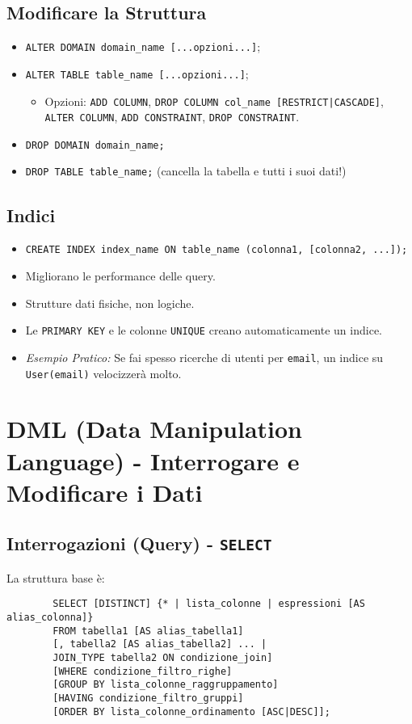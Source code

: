 \documentclass{article}
\begin{document}
	\subsection{Modificare la Struttura}
	\begin{itemize}
		\item \texttt{ALTER DOMAIN domain\_name [...opzioni...]};
		\item \texttt{ALTER TABLE table\_name [...opzioni...]};
		\begin{itemize}
			\item Opzioni: \texttt{ADD COLUMN}, \texttt{DROP COLUMN col\_name [RESTRICT|CASCADE]}, \texttt{ALTER COLUMN}, \texttt{ADD CONSTRAINT}, \texttt{DROP CONSTRAINT}.
		\end{itemize}
		\item \texttt{DROP DOMAIN domain\_name;}
		\item \texttt{DROP TABLE table\_name;} (cancella la tabella e tutti i suoi dati!)
	\end{itemize}
	
	\subsection{Indici}
	\begin{itemize}
		\item \texttt{CREATE INDEX index\_name ON table\_name (colonna1, [colonna2, ...]);}
		\item Migliorano le performance delle query.
		\item Strutture dati fisiche, non logiche.
		\item Le \texttt{PRIMARY KEY} e le colonne \texttt{UNIQUE} creano automaticamente un indice.
		\item \textit{Esempio Pratico:} Se fai spesso ricerche di utenti per \texttt{email}, un indice su \texttt{User(email)} velocizzerà molto.
	\end{itemize}
	
	
	\section{DML (Data Manipulation Language) - Interrogare e Modificare i Dati}
	
	\subsection{Interrogazioni (Query) - \texttt{SELECT}}
	La struttura base è:
	\begin{verbatim}
		SELECT [DISTINCT] {* | lista_colonne | espressioni [AS alias_colonna]}
		FROM tabella1 [AS alias_tabella1]
		[, tabella2 [AS alias_tabella2] ... |
		JOIN_TYPE tabella2 ON condizione_join]
		[WHERE condizione_filtro_righe]
		[GROUP BY lista_colonne_raggruppamento]
		[HAVING condizione_filtro_gruppi]
		[ORDER BY lista_colonne_ordinamento [ASC|DESC]];
	\end{verbatim}
	
\end{document}
